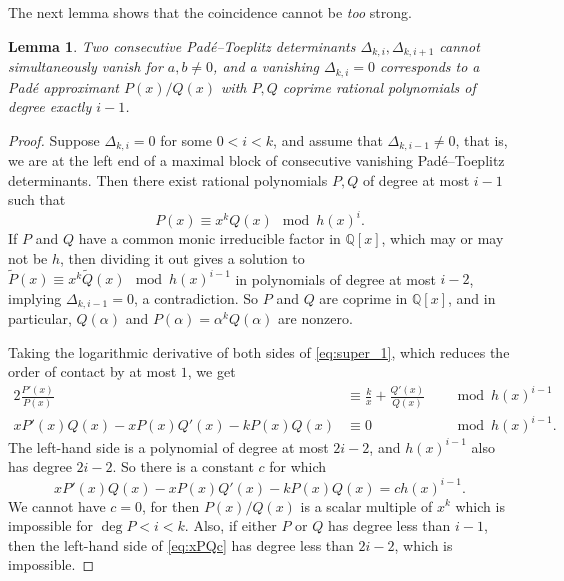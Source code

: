 \documentclass{article}
\numberwithin{equation}{section}
\newtheorem{lem}[thm]{Lemma}
\theoremstyle{definition}
\theoremstyle{remark}
\newcommand{\QQ}{\mathbb{Q}}
\newcommand{\<}{\left\langle}
\renewcommand{\>}{\right\rangle}
\begin{document}
The next lemma shows that the coincidence cannot be \emph{too} strong.
\begin{lem}\label{lem:no_super}
  Two consecutive Pad\'e--Toeplitz determinants $\Delta_{k,i}, \Delta_{k,i+1}$ cannot simultaneously vanish for $a, b \neq 0$, and a vanishing $\Delta_{k,i} = 0$ corresponds to a Pad\'e approximant $P(x)/Q(x)$ with $P, Q$ coprime rational polynomials of degree exactly $i - 1$.
\end{lem}
\begin{proof}
  Suppose $\Delta_{k,i} = 0$ for some $0 < i < k$, and assume that $\Delta_{k,i-1} \neq 0$, that is, we are at the left end of a maximal block of consecutive vanishing Pad\'e--Toeplitz determinants. Then there exist rational polynomials $P,Q$ of degree at most $i - 1$ such that
  \begin{equation} \label{eq:super_1}
    P(x) \equiv x^k Q(x) \mod h(x)^i.
  \end{equation}
  If $P$ and $Q$ have a common monic irreducible factor in $\QQ[x]$, which may or may not be $h$, then dividing it out gives a solution to $\widetilde{P}(x) \equiv x^k \widetilde{Q}(x) \mod h(x)^{i-1}$ in polynomials of degree at most $i - 2$, implying $\Delta_{k,i-1} = 0$, a contradiction. So $P$ and $Q$ are coprime in $\QQ[x]$, and in particular, $Q(\alpha)$ and $P(\alpha) = \alpha^k Q(\alpha)$ are nonzero.

  Taking the logarithmic derivative of both sides of \eqref{eq:super_1}, which reduces the order of contact by at most $1$, we get
  \begin{alignat*}{2}
    \frac{P'(x)}{P(x)} &\equiv \frac{k}{x} + \frac{Q'(x)}{Q(x)} &&\mod h(x)^{i-1} \\
    x P'(x) Q(x) - x P(x) Q'(x) - k P(x) Q(x) &\equiv 0 &&\mod h(x)^{i-1}.
  \end{alignat*}
  The left-hand side is a polynomial of degree at most $2i - 2$, and $h(x)^{i-1}$ also has degree $2 i - 2$. So there is a constant $c$ for which
  \begin{equation} \label{eq:xPQc}
    x P'(x) Q(x) - x P(x) Q'(x) - k P(x) Q(x) = c h(x)^{i-1}.
  \end{equation}
  We cannot have $c = 0$, for then $P(x)/Q(x)$ is a scalar multiple of $x^k$ which is impossible for $\deg P < i < k$. Also, if either $P$ or $Q$ has degree less than $i - 1$, then the left-hand side of \eqref{eq:xPQc} has degree less than $2 i - 2$, which is impossible.


\end{proof}
\end{document}
